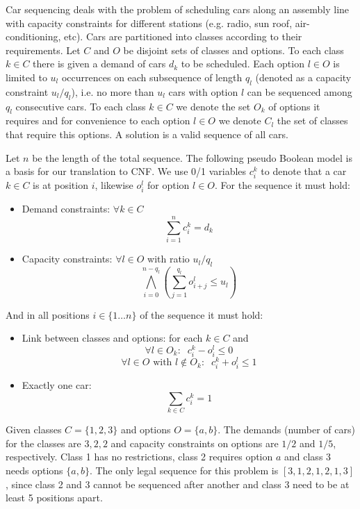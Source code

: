 \documentclass[]{llncs}
\begin{document}
Car sequencing deals with the problem of scheduling cars along an assembly line with capacity constraints for different
stations (e.g. radio, sun roof, air-conditioning, etc). Cars are partitioned into classes according to their
requirements. Let $C$ and $O$ be disjoint sets of classes and options. To each class $k\in C$ there is given a demand of
cars $d_k$ to be scheduled. Each option $l\in O$ is limited to $u_l$ occurrences on each subsequence of length $q_l$
(denoted as a capacity constraint $u_l/q_l$), i.e.  no more than $u_l$ cars with option $l$ can be sequenced among $q_l$
consecutive cars. To each class $k\in C$ we denote the set $O_k$ of options it requires and for convenience to each
option $l\in O$ we denote $C_l$ the set of classes that require this options. A solution is a valid sequence of all
cars. 

Let $n$ be the length of the total sequence. The following pseudo Boolean model is a basis for our translation to CNF.
We use 0/1 variables $c^k_i$ to denote that a car $k\in C$ is at position $i$, likewise $o^l_i$ for option $l\in O$. For
the sequence it must hold: 

\begin{itemize}
    \item Demand constraints: $\forall k \in C$ $$\sum^n_{i=1} c^k_i = d_k$$                       
    \item Capacity constraints: $\forall l \in O$ with ratio $u_l/q_l$ $$\bigwedge_{i=0}^{n-q_l}(\sum_{j=1}^{q_l} o^l_{i+j} \leq u_l )$$
\end{itemize}
        And in all positions $i \in \{1\ldots n\}$ of the sequence it must hold:                                                    
\begin{itemize}
    \item Link between classes and options: for each $k\in C$ and 
$$\forall l \in O_k :\;\; c^k_i - o^l_i \leq 0$$  
$$\forall l \in O \text{ with } l \not \in O_k :\;\; c^k_i + o^l_i \leq 1$$  
    \item Exactly one car:  $$\sum_{k\in C} c^k_i = 1$$  
\end{itemize}

\begin{example} 
    Given classes $C = \{1,2,3\}$ and options $O = \{a,b\}$. The demands (number of cars) for the classes are $3,2,2$
    and capacity constraints on options are $1/2$ and $1/5$, respectively. Class 1 has no restrictions, class 2 requires
    option $a$ and class 3 needs options $\{a, b\}$. The only legal sequence for this problem is $[3,1,2,1,2,1,3]$,
    since class 2 and 3 cannot be sequenced after another and class 3 need to be at least 5 positions apart.
\end{example}                                     
\end{document}
